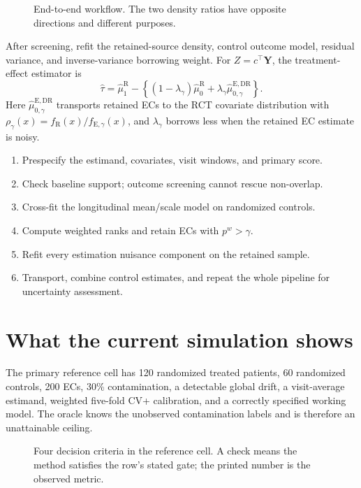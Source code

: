 \documentclass[10pt]{article}
\newcommand{\R}{\mathrm{R}}
\newcommand{\E}{\mathrm{E}}
\newcommand{\fullfig}[1]{\resizebox{\linewidth}{!}{}}
\begin{document}
\begin{figure}[!h]
\centering\fullfig{screen_refit_workflow.tex}
\caption{End-to-end workflow. The two density ratios have opposite directions and different purposes.}
\end{figure}

After screening, refit the retained-source density, control outcome model, residual variance, and inverse-variance borrowing weight. For $Z=c^\top\bm Y$, the treatment-effect estimator is
\[
\widehat\tau=\widehat\mu_1^\R-
\left\{(1-\lambda_\gamma)\widehat\mu_0^\R
+\lambda_\gamma\widehat\mu_{0,\gamma}^{\E,\mathrm{DR}}\right\}.
\]
Here $\widehat\mu_{0,\gamma}^{\E,\mathrm{DR}}$ transports retained ECs to the RCT covariate distribution with $\rho_\gamma(x)=f_\R(x)/f_{\E,\gamma}(x)$, and $\lambda_\gamma$ borrows less when the retained EC estimate is noisy.

\begin{enumerate}
\item Prespecify the estimand, covariates, visit windows, and primary score.
\item Check baseline support; outcome screening cannot rescue non-overlap.
\item Cross-fit the longitudinal mean/scale model on randomized controls.
\item Compute weighted ranks and retain ECs with $p^w>\gamma$.
\item Refit every estimation nuisance component on the retained sample.
\item Transport, combine control estimates, and repeat the whole pipeline for uncertainty assessment.
\end{enumerate}

\clearpage
\section{What the current simulation shows}

The primary reference cell has 120 randomized treated patients, 60 randomized controls, 200 ECs, 30\% contamination, a detectable global drift, a visit-average estimand, weighted five-fold CV+ calibration, and a correctly specified working model. The oracle knows the unobserved contamination labels and is therefore an unattainable ceiling.

\begin{figure}[!h]
\centering\fullfig{results_dashboard.tex}
\caption{Four decision criteria in the reference cell. A check means the method satisfies the row's stated gate; the printed number is the observed metric.}
\end{figure}
\end{document}
